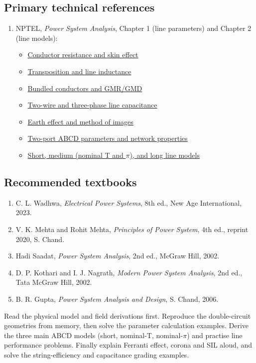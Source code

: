 \documentclass[11pt,a4paper]{article}
\newenvironment{Idea}[1]{\begin{tcolorbox}[colback=pale,colframe=teal,coltitle=white,title={#1}]}{\end{tcolorbox}}
\begin{document}
\subsection{Primary technical references}
\begin{enumerate}
\item NPTEL, \emph{Power System Analysis}, Chapter 1 (line parameters) and Chapter 2 (line models):
\begin{itemize}
\item \href{https://archive.nptel.ac.in/content/storage2/courses/108104051/chapter_1/1_3.html}{Conductor resistance and skin effect}
\item \href{https://archive.nptel.ac.in/content/storage2/courses/108104051/chapter_1/1_8.html}{Transposition and line inductance}
\item \href{https://archive.nptel.ac.in/content/storage2/courses/108104051/chapter_1/1_10.html}{Bundled conductors and GMR/GMD}
\item \href{https://archive.nptel.ac.in/content/storage2/courses/108104051/chapter_1/1_13.html}{Two-wire and three-phase line capacitance}
\item \href{https://archive.nptel.ac.in/content/storage2/courses/108104051/chapter_1/1_15.html}{Earth effect and method of images}
\item \href{https://archive.nptel.ac.in/content/storage2/courses/108104051/chapter_2/2_2.html}{Two-port ABCD parameters and network properties}
\item \href{https://archive.nptel.ac.in/content/storage2/courses/108104051/chapter_2/2_3.html}{Short, medium (nominal T and $\pi$), and long line models}
\end{itemize}
\end{enumerate}

\subsection{Recommended textbooks}
\begin{enumerate}
\item C. L. Wadhwa, \emph{Electrical Power Systems}, 8th ed., New Age International, 2023.
\item V. K. Mehta and Rohit Mehta, \emph{Principles of Power System}, 4th ed., reprint 2020, S. Chand.
\item Hadi Saadat, \emph{Power System Analysis}, 2nd ed., McGraw Hill, 2002.
\item D. P. Kothari and I. J. Nagrath, \emph{Modern Power System Analysis}, 2nd ed., Tata McGraw Hill, 2002.
\item B. R. Gupta, \emph{Power System Analysis and Design}, S. Chand, 2006.
\end{enumerate}

\begin{Idea}{A practical sequence for studying this note}
Read the physical model and field derivations first. Reproduce the double-circuit geometries from memory, then solve the parameter calculation examples. Derive the three main ABCD models (short, nominal-T, nominal-$\pi$) and practise line performance problems. Finally explain Ferranti effect, corona and SIL aloud, and solve the string-efficiency and capacitance grading examples.
\end{Idea}
\end{document}
